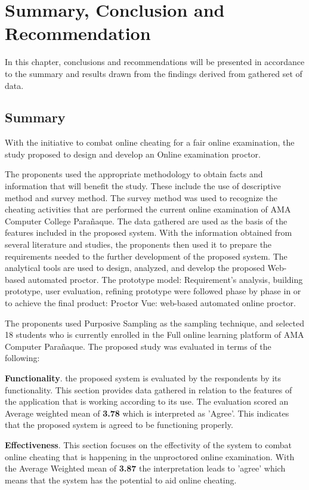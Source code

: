 \chapter{Summary, Conclusion and Recommendation}

In this chapter, conclusions and recommendations will be presented in accordance to the summary and results drawn from the findings derived from gathered set of data.

\section{Summary}

With the initiative to combat online cheating for a fair online examination, the study proposed to design and develop an Online examination proctor.

The proponents used the appropriate methodology to obtain facts and information that will benefit the study.
These include the use of descriptive method and survey method.
The survey method was used to recognize the cheating activities that are performed the current online examination of AMA Computer College Parañaque.
The data gathered are used as the basis of the features included in the proposed system.
With the information obtained from several literature and studies, the proponents then used it to prepare the requirements needed to the further development of the proposed system.
The analytical tools are used to design, analyzed, and develop the proposed Web-based automated proctor.
The prototype model: Requirement's analysis, building prototype, user evaluation, refining prototype were followed phase by phase in or to achieve the final product: Proctor Vue: web-based automated online proctor.

The proponents used Purposive Sampling as the sampling technique, and selected 18 students who is currently enrolled in the Full online learning platform of AMA Computer Parañaque.
The proposed study was evaluated in terms of the following:

\textbf{Functionality}.
the proposed system is evaluated by the respondents by its functionality.
This section provides data gathered in relation to the features of the application that is working according to its use.
The evaluation scored an Average weighted mean of \textbf{3.78} which is interpreted as 'Agree'.
This indicates that the proposed system is agreed to be functioning properly.

\textbf{Effectiveness}.
This section focuses on the effectivity of the system to combat online cheating that is happening in the unproctored online examination.
With the Average Weighted mean of \textbf{3.87} the interpretation leads to 'agree' which means that the system has the potential to aid online cheating.

